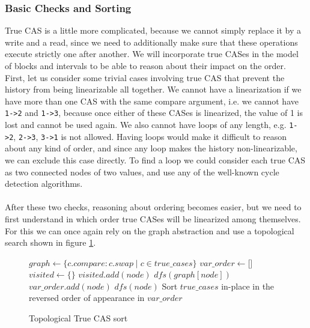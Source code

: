 \documentclass[oneside, a4paper, onecolumn, 10pt]{article}
\begin{document}
\subsubsection{Basic Checks and Sorting}
True CAS is a little more complicated, because we cannot simply replace it by a write and a read, since we need to additionally make sure that these operations execute strictly one after another. We will incorporate true CASes in the model of blocks and intervals to be able to reason about their impact on the order. First, let us consider some trivial cases involving true CAS that prevent the history from being linearizable all together. We cannot have a linearization if we have more than one CAS with the same compare argument, i.e. we cannot have \verb|1->2| and \verb|1->3|, because once either of these CASes is linearized, the value of 1 is lost and cannot be used again. We also cannot have loops of any length, e.g. \verb|1->2|, \verb|2->3|, \verb|3->1| is not allowed. Having loops would make it difficult to reason about any kind of order, and since any loop makes the history non-linearizable, we can exclude this case directly. To find a loop we could consider each true CAS as two connected nodes of two values, and use any of the well-known cycle detection algorithms. \\\\
After these two checks, reasoning about ordering becomes easier, but we need to first understand in which order true CASes will be linearized among themselves. For this we can once again rely on the graph abstraction and use a topological search shown in figure \ref{Topological True CAS Sort}.
\begin{figure}[h]
  \begin{algorithmic}
    \State $graph \gets \{c.compare: c.swap \mid c \in true\_cases\}$
    \State $var\_order \gets \texttt{[]}$
    \State $visited \gets \texttt{\{\}}$
    \State \Return
    \EndIf
    \State $visited.add(node)$
    \State $dfs(graph[node])$
    \EndIf
    \State $var\_order.add(node)$
    \EndFunction
    \State $dfs(node)$
    \EndFor
    \State Sort $true\_cases$ in-place in the reversed order of appearance in $var\_order$
    \EndFunction
  \end{algorithmic}
  \caption{\label{Topological True CAS Sort}Topological True CAS sort}
\end{figure}
\end{document}
